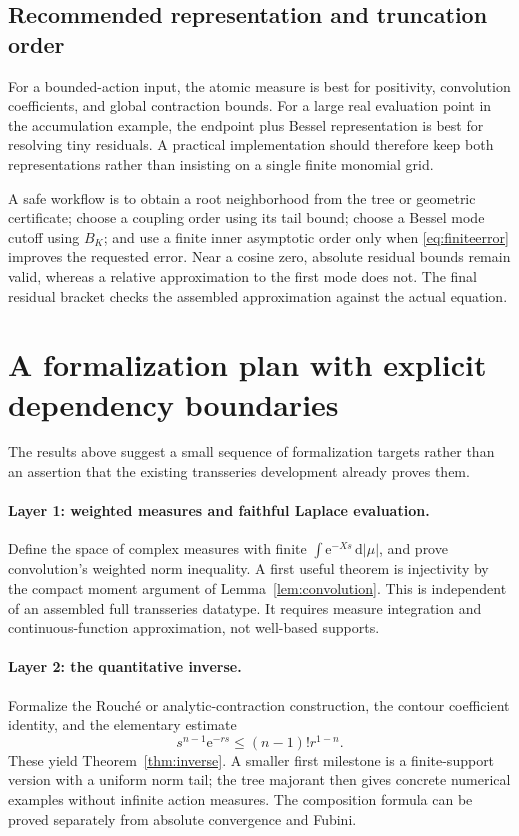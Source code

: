 \documentclass[11pt,a4paper]{article}
\theoremstyle{definition}
\theoremstyle{remark}
\newcommand{\dd}{\,\mathrm d}
\newcommand{\e}{\mathrm e}
\numberwithin{equation}{section}
\begin{document}
\subsection{Recommended representation and truncation order}
For a bounded-action input, the atomic measure is best for positivity, convolution coefficients, and global contraction bounds. For a large real evaluation point in the accumulation example, the endpoint plus Bessel representation is best for resolving tiny residuals. A practical implementation should therefore keep both representations rather than insisting on a single finite monomial grid.

A safe workflow is to obtain a root neighborhood from the tree or geometric certificate; choose a coupling order using its tail bound; choose a Bessel mode cutoff using $B_K$; and use a finite inner asymptotic order only when \eqref{eq:finiteerror} improves the requested error. Near a cosine zero, absolute residual bounds remain valid, whereas a relative approximation to the first mode does not. The final residual bracket checks the assembled approximation against the actual equation.

\section{A formalization plan with explicit dependency boundaries}\label{sec:lean}
The results above suggest a small sequence of formalization targets rather than an assertion that the existing transseries development already proves them.

\paragraph{Layer 1: weighted measures and faithful Laplace evaluation.}
Define the space of complex measures with finite $\int\e^{-Xs}\dd|\mu|$, and prove convolution's weighted norm inequality. A first useful theorem is injectivity by the compact moment argument of Lemma~\ref{lem:convolution}. This is independent of an assembled full transseries datatype. It requires measure integration and continuous-function approximation, not well-based supports.

\paragraph{Layer 2: the quantitative inverse.}
Formalize the Rouch\'e or analytic-contraction construction, the contour coefficient identity, and the elementary estimate
\[
 s^{n-1}\e^{-rs}\le(n-1)!r^{1-n}.
\]
These yield Theorem~\ref{thm:inverse}. A smaller first milestone is a finite-support version with a uniform norm tail; the tree majorant then gives concrete numerical examples without infinite action measures. The composition formula can be proved separately from absolute convergence and Fubini.
\end{document}
